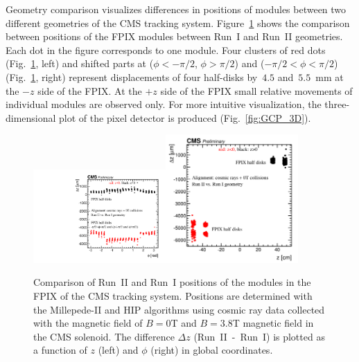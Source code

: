 Geometry comparison visualizes differences in positions of modules between two different geometries of the CMS tracking system. Figure~\ref{fig:GCP_FPIX} shows the comparison between positions of the FPIX modules between Run~I and Run~II geometries. Each dot in the figure corresponds to one module. Four clusters of red dots (Fig.~\ref{fig:GCP_FPIX}, left) and shifted parts at ($\phi<-\pi/2$, $\phi>\pi/2$) and ($-\pi/2<\phi<\pi/2$) (Fig.~\ref{fig:GCP_FPIX}, right) represent displacements of four half-disks by~$4.5$ and~$5.5$~mm at the $-z$ side of the FPIX. At the $+z$ side of the FPIX small relative movements of individual modules are observed only. For more intuitive visualization, the three-dimensional plot of the pixel detector is produced (Fig.~\ref{fig:GCP_3D}).     

\begin{figure}[htb]
    \begin{center}
        \includegraphics[width=0.45\textwidth]{../figs/Alignment/AlRes_phi_vs_dz_PXF_1.pdf}\includegraphics[width=0.45\textwidth]{../figs/Alignment/AlRes_z_vs_dz_PXF_1.png}
    \end{center}
    \caption{Comparison of Run~II and Run~I positions of the modules in the FPIX of the CMS tracking system. Positions are determined with the Millepede-II and HIP algorithms using cosmic ray data collected with the magnetic field of $B=0$T and $B=3.8$T magnetic field in the CMS solenoid. The difference $\Delta z$ (Run~II~-~Run~I) is plotted as a function of $z$ (left) and $\phi$ (right) in global coordinates.}
    \label{fig:GCP_FPIX}
\end{figure}

